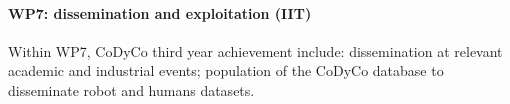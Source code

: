 

\paragraph*{WP7: dissemination and exploitation (IIT)}

Within WP7, CoDyCo third year achievement include: dissemination at relevant academic and industrial events; population of the CoDyCo database to disseminate robot and humans datasets. 